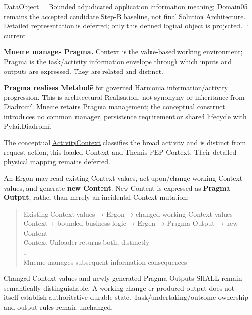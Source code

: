 \label{element:27ad143e7c784e378556af8a57c438f7}
{\small DataObject · Bounded adjudicated application information meaning; Domain05 remains the accepted candidate Step-B baseline, not final Solution Architecture. Detailed representation is deferred; only this defined logical object is projected. · current}\par

\textbf{Mneme manages Pragma.} Context is the value-based working environment;
Pragma is the task/activity information envelope through which inputs and outputs
are expressed. They are related and distinct.



\textbf{Pragma realises \hyperref[element:c34b4929f71946708d37dbe6c1da920a]{Metabolē}}
for governed Harmonia information/activity progression. This is architectural
Realisation, not synonymy or inheritance from Diadromí. Mneme retains Pragma
management; the conceptual construct introduces no common manager, persistence
requirement or shared lifecycle with Pylai.Diadromí.



The conceptual
\hyperref[element:c34b4929f71946708d37dbe6c1da920a]{ActivityContext}
classifies the broad activity and is distinct from request action, this loaded
Context and Themis PEP-Context. Their detailed physical mapping remains deferred.



An Ergon may read existing Context values, act upon/change working Context
values, and generate \textbf{new Content}. New Content is expressed as \textbf{Pragma
Output}, rather than merely an incidental Context mutation:



\begin{quote}\small\ttfamily
Existing Context values → Ergon → changed working Context values\\
Context + bounded business logic → Ergon → Pragma Output → new Content\\
                  Context Unloader returns both, distinctly\\
                                    ↓\\
                 Mneme manages subsequent information consequences\\

\end{quote}


Changed Context values and newly generated Pragma Outputs SHALL remain
semantically distinguishable. A working change or produced output does not
itself establish authoritative durable state. Task/undertaking/outcome ownership
and output rules remain unchanged.



